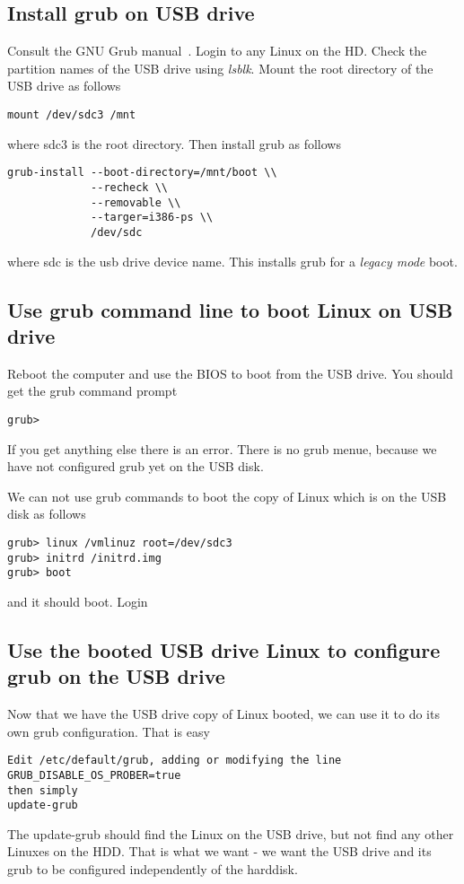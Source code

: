 \documentclass{article}  %
\begin{document}
\subsection{Install grub on USB drive}
Consult the GNU Grub manual~\cite{gnu:21}.
Login to any Linux on the HD.  Check the partition names of the USB drive using {\em lsblk}. Mount the root directory of the USB drive as follows
\begin{verbatim}
mount /dev/sdc3 /mnt
\end{verbatim} 
where sdc3 is the root directory. Then install grub as follows
\begin{verbatim}
grub-install --boot-directory=/mnt/boot \\
             --recheck \\
             --removable \\
             --targer=i386-ps \\
             /dev/sdc
\end{verbatim}
where sdc is the usb drive device name. 
This installs grub for a {\em legacy mode} boot.

\subsection{Use grub command line to boot Linux on USB drive}
Reboot the computer and use the BIOS to boot from the USB drive. You should get the grub command prompt
\begin{verbatim}
grub>
\end{verbatim}
If you get anything else there is an error.
There is no grub menue, because we have not configured grub yet on the USB disk.

We can not use grub commands to boot the copy of Linux which is on the USB disk as follows
\begin{verbatim}
grub> linux /vmlinuz root=/dev/sdc3
grub> initrd /initrd.img
grub> boot
\end{verbatim}
and it should boot. Login

\subsection{Use the booted USB drive Linux to configure grub on the USB drive}
Now that we have the USB drive copy of Linux booted, we can use it to do its own grub configuration.
That is easy
\begin{verbatim}
Edit /etc/default/grub, adding or modifying the line
GRUB_DISABLE_OS_PROBER=true
then simply
update-grub
\end{verbatim}
The update-grub should find the Linux on the USB drive, but not find any other Linuxes on the HDD. That is what we want - we want the USB drive and its grub to be configured independently of the harddisk.
\end{document}
